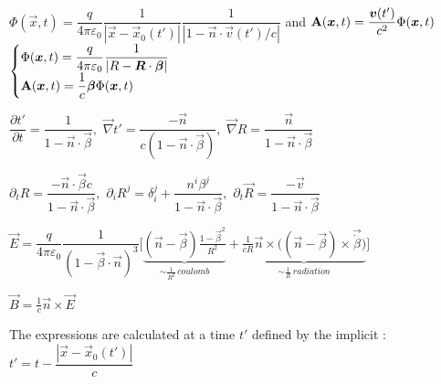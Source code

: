 \item $\Phi(\vec{x},t) = \dfrac{q}{4\pi\varepsilon_0} \dfrac{1}{|\vec{x} - \vec{x}_0(t')|} \dfrac{1}{|1- \vec{n}\cdot\vec{v}(t')/c|}$ and  $\vec{\rm{A}}(\vec{x},t) = \dfrac{\vec{v}(t')}{c^2} \Phi(\vec{x},t)$
\\
$\begin{cases}
\Phi(\vec{x},t) = \dfrac{q}{4\pi\varepsilon_0} \dfrac{1}{|R-\vec{R}\cdot\vec{\beta}|}
\\
\vec{\rm{A}}(\vec{x},t) = \dfrac{1}{c}\vec{\beta} \Phi(\vec{x},t)
\end{cases}$

\item $\dfrac{\partial t'}{\partial t} = \dfrac{1}{1-\vec{n}\cdot\vec{\beta}}, \,\, \vec{\nabla}t' = \dfrac{-\vec{n}}{c(1-\vec{n}\cdot\vec{\beta})}, \,\, \vec{\nabla}R = \dfrac{\vec{n}}{1-\vec{n}\cdot\vec{\beta}}$

\item $\partial_t R = \dfrac{-\vec{n}\cdot\vec{\beta}c}{1-\vec{n}\cdot\vec{\beta}}, \,\, \partial_i R^j = \delta_i^j + \dfrac{n^i\beta^j}{1-\vec{n}\cdot\vec{\beta}}, \,\, \partial_t \vec{R} = \dfrac{-\vec{v}}{1-\vec{n}\cdot\vec{\beta}}$


\item $\vec{E} =  \dfrac{q}{4\pi\varepsilon_0} \dfrac{1}{ (1-\vec{\beta}\cdot\vec{n})^3} \big[\underbrace{(\vec{n} - \vec{\beta})\frac{1-\vec{\beta}^2}{R^2}}_{\sim \frac{1}{R^2} \, coulomb} + \underbrace{\frac{1}{cR}\vec{n}\times \big( (\vec{n}-\vec{\beta})\times \vec{\dot{\beta}}\big)}_{\sim \frac{1}{R} \, radiation}\big]$
\item $\vec{B} = \frac{1}{c} \vec{n} \times \vec{E}$

The expressions are calculated at a time $t'$ defined by the implicit : $t' = t - \dfrac{|\vec{x} - \vec{x}_0(t')|}{c}$%

\squishend


